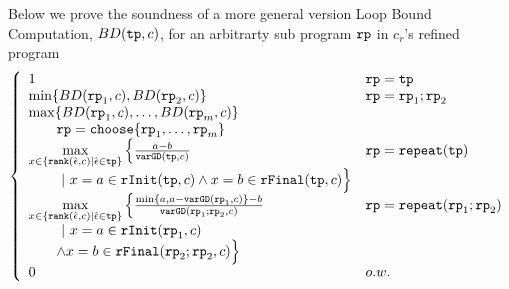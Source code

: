 Below we prove the soundness of a more general version Loop Bound Computation, $BD(\mathtt{tp}, c)$, for an arbitrarty sub program $\mathtt{rp}$ in $c_r$'s refined program
\[
  \left\{
  \begin{array}{lll}
    1 &  \rprog = \tpath\\
    \min \left\{BD(\rprog_1, c), BD(\rprog_2, c) \right\} & \rprog = \rprog_1;\rprog_2\\
    \max\left\{ BD(\rprog_1, c), \ldots, BD(\rprog_m, c) \right\} & \\
    \qquad 
    \rprog = \rpchoose{\rprog_1, \ldots, \rprog_m } 
    \\
    \max\limits_{x \in \left\{ \rank(\absevent, c) | \absevent \in \tpath \right\}} 
    \Big\{ \highlight{\frac{a - b}{\varGD(\tpath, c)}}  &  \rprog = \rprepeat(\tpath)
    \\ \qquad 
    ~\vert~
    x = a \in \rfinit(\tpath, c)
    \land x = b \in \rffinal(\tpath, c)
    \Big\} 
    \\
  \max\limits_{x \in \left\{ \rank(\absevent, c) | \absevent \in \tpath \right\}} 
    \Big\{ \highlight{\frac{\min\{ a, a - \varGD(\rprog_1, c) \} - b}{\varGD(\rprog_1;\rprog_2, c)}}  
    &  \rprog = \rprepeat(\rprog_1;\rprog_2)
    \\ \qquad 
    ~\vert~
    x = a \in \rfinit(\rprog_1, c)
    \\ \qquad
    \land x = b \in \rffinal(\rprog_2;\rprog_2, c)
    \Big\}   \\
  0  &  o.w.
\end{array}
\right.
\]
 
